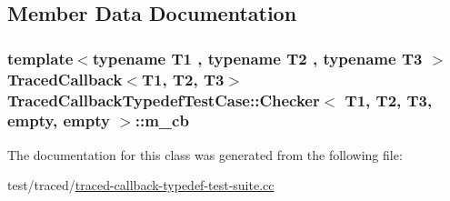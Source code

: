 \subsection{Member Data Documentation}
\subsubsection[{\texorpdfstring{m\+\_\+cb}{m_cb}}]{\setlength{\rightskip}{0pt plus 5cm}template$<$typename T1 , typename T2 , typename T3 $>$ {\bf Traced\+Callback}$<$T1, T2, T3$>$ {\bf Traced\+Callback\+Typedef\+Test\+Case\+::\+Checker}$<$ T1, T2, T3, {\bf empty}, {\bf empty} $>$\+::m\+\_\+cb\hspace{0.3cm}{\ttfamily [private]}}\hypertarget{classTracedCallbackTypedefTestCase_1_1Checker_3_01T1_00_01T2_00_01T3_00_01empty_00_01empty_01_4_a6957bc73e64106ed1a8716e6e553aeec}{}\label{classTracedCallbackTypedefTestCase_1_1Checker_3_01T1_00_01T2_00_01T3_00_01empty_00_01empty_01_4_a6957bc73e64106ed1a8716e6e553aeec}


The documentation for this class was generated from the following file\+:\begin{DoxyCompactItemize}
\item 
test/traced/\hyperlink{traced-callback-typedef-test-suite_8cc}{traced-\/callback-\/typedef-\/test-\/suite.\+cc}\end{DoxyCompactItemize}
